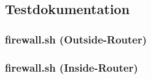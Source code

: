 \subsection{Testdokumentation}
\label{app:Test}
\subsubsection{firewall.sh (Outside-Router)}

\subsubsection{firewall.sh (Inside-Router)}
